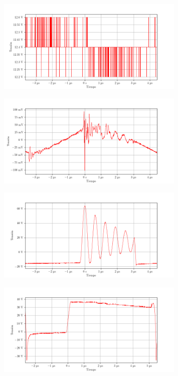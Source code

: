 \begin{figure}[ht]
    \centering
    \includegraphics[width=0.8\textwidth]{images/capturas-osciloscopio/17-11-2022/57.png}
    \caption{}
    \label{fig:osc:57}
\end{figure}

\begin{figure}[ht]
    \centering
    \includegraphics[width=0.8\textwidth]{images/capturas-osciloscopio/17-11-2022/58.png}
    \caption{}
    \label{fig:osc:58}
\end{figure}

\begin{figure}[ht]
    \centering
    \includegraphics[width=0.8\textwidth]{images/capturas-osciloscopio/17-11-2022/59.png}
    \caption{}
    \label{fig:osc:59}
\end{figure}

\begin{figure}[ht]
    \centering
    \includegraphics[width=0.8\textwidth]{images/capturas-osciloscopio/17-11-2022/60.png}
    \caption{}
    \label{fig:osc:60}
\end{figure}

